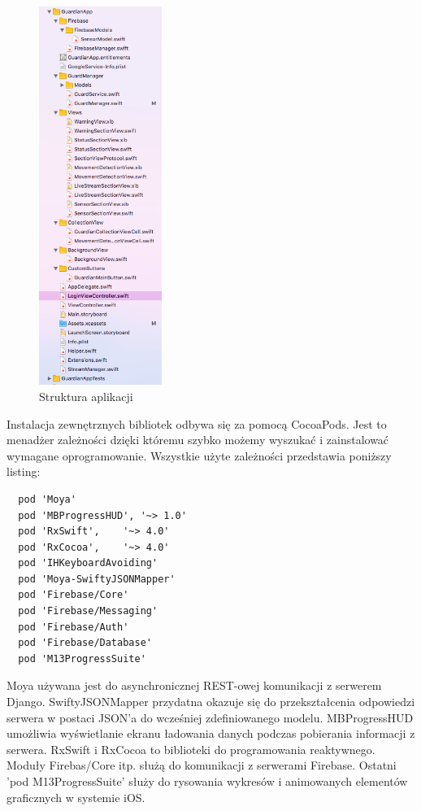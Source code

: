 \begin{figure}[h]
	\centering
	\includegraphics[width=4cm]{iOSstructure}
	\caption{Struktura aplikacji}
\end{figure}


Instalacja zewnętrznych bibliotek odbywa się za pomocą CocoaPods. Jest to menadżer zależności dzięki któremu szybko możemy wyszukać i zainstalować wymagane oprogramowanie. Wszystkie użyte zależności przedstawia poniższy listing: 

\begin{verbatim}
  pod 'Moya'
  pod 'MBProgressHUD', '~> 1.0'
  pod 'RxSwift',    '~> 4.0'
  pod 'RxCocoa',    '~> 4.0'
  pod 'IHKeyboardAvoiding'
  pod 'Moya-SwiftyJSONMapper'
  pod 'Firebase/Core'
  pod 'Firebase/Messaging'
  pod 'Firebase/Auth'
  pod 'Firebase/Database'
  pod 'M13ProgressSuite'
\end{verbatim}
Moya używana jest do asynchronicznej REST-owej komunikacji z serwerem Django. SwiftyJSONMapper przydatna okazuje się do przekształcenia odpowiedzi serwera w postaci JSON'a do wcześniej zdefiniowanego modelu. MBProgressHUD umożliwia wyświetlanie ekranu ładowania danych podczas pobierania informacji z serwera. RxSwift i RxCocoa to biblioteki do programowania reaktywnego. Moduły Firebas/Core itp. służą do komunikacji z serwerami Firebase. Ostatni 'pod M13ProgressSuite' służy do rysowania wykresów i animowanych elementów graficznych w systemie iOS.

